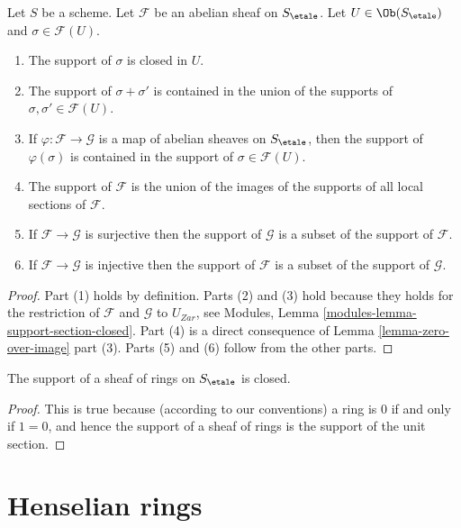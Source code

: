 \begin{lemma}
\label{lemma-support-section-closed}
Let $S$ be a scheme.
Let $\mathcal{F}$ be an abelian sheaf on $S_\etale$.
Let $U \in \Ob(S_\etale)$ and $\sigma \in \mathcal{F}(U)$.
\begin{enumerate}
\item The support of $\sigma$ is closed in $U$.
\item The support of $\sigma + \sigma'$ is contained in the union of
the supports of $\sigma, \sigma' \in \mathcal{F}(U)$.
\item If $\varphi : \mathcal{F} \to \mathcal{G}$ is a map of
abelian sheaves on $S_\etale$, then the support of $\varphi(\sigma)$
is contained in the support of $\sigma \in \mathcal{F}(U)$.
\item The support of $\mathcal{F}$ is the union of the images of the
supports of all local sections of $\mathcal{F}$.
\item If $\mathcal{F} \to \mathcal{G}$ is surjective then the support
of $\mathcal{G}$ is a subset of the support of $\mathcal{F}$.
\item If $\mathcal{F} \to \mathcal{G}$ is injective then the support
of $\mathcal{F}$ is a subset of the support of $\mathcal{G}$.
\end{enumerate}
\end{lemma}

\begin{proof}
Part (1) holds by definition.
Parts (2) and (3) hold because they holds for the restriction of
$\mathcal{F}$ and $\mathcal{G}$ to $U_{Zar}$, see
Modules, Lemma \ref{modules-lemma-support-section-closed}.
Part (4) is a direct consequence of
Lemma \ref{lemma-zero-over-image} part (3).
Parts (5) and (6) follow from the other parts.
\end{proof}

\begin{lemma}
\label{lemma-support-sheaf-rings-closed}
The support of a sheaf of rings on $S_\etale$ is closed.
\end{lemma}

\begin{proof}
This is true because (according to our conventions)
a ring is $0$ if and only if
$1 = 0$, and hence the support of a sheaf of rings
is the support of the unit section.
\end{proof}




\section{Henselian rings}
\label{section-henselian-ring}

